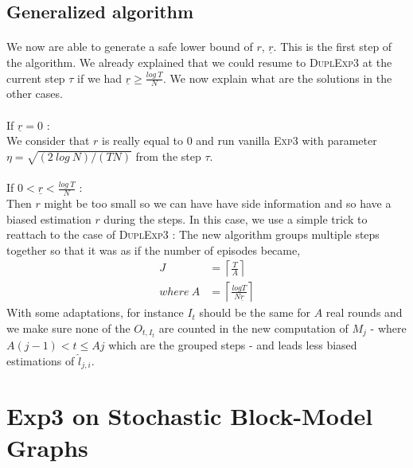\documentclass[11pt,a4paper]{article}
\begin{document}
\subsection{Generalized algorithm}
\paragraph{}We now are able to generate a safe lower bound of $r$, $\underline{r}$. This is the first step of the algorithm. We already explained that we could resume to \textsc{DuplExp3} at the current step $\tau$ if we had $ \underline{r} \geq \frac{log\ T}{N}$. We now explain what are the solutions in the other cases.\\

\paragraph{} If $\underline{r}=0$ : \\
We consider that $r$ is really equal to $0$ and run vanilla \textsc{Exp3} with parameter $\eta=\sqrt{\left(2\ log\ N \right)/\left(TN\right)}$ from the step $\tau$.

\paragraph{}If $0 < \underline{r} < \frac{log\ T}{N}$ :\\
Then $r$ might be too small so we can have have side information and so have a biased estimation $r$ during the steps. In this case, we use a simple trick to reattach to the case of \textsc{DuplExp3} : The new algorithm groups multiple steps together so that it was as if the number of episodes became,
\begin{align*}
J &= \left\lceil \frac{T}{A} \right\rceil \\
where\ A & =\left\lceil \frac{log T}{N \underline{r}} \right\rceil
\end{align*}
With some adaptations, for instance $I_t$ should be the same for $A$ real rounds and we make sure none of the $O_{t,I_t}$ are counted in the new computation of $M_j$ - where $A(j-1)<t\leq Aj$ which are the grouped steps - and leads less biased estimations of $\hat{l}_{j,i}$.

\section{Exp3 on Stochastic Block-Model Graphs}
\end{document}
